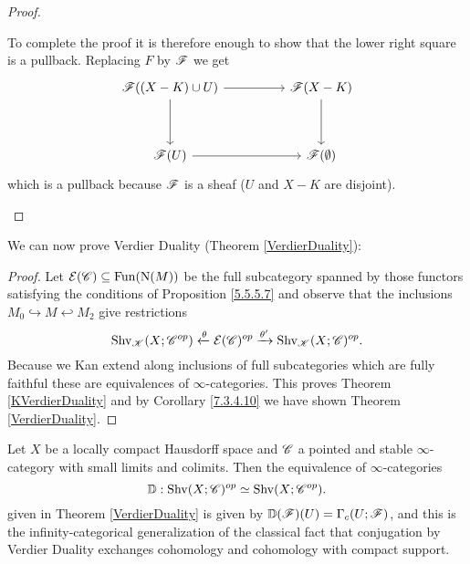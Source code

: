 \documentclass[../../thesis.tex]{subfiles}
\begin{document}
\begin{proof}
\begin{enumerate}[label=(\alph*)]
              To complete the proof it is therefore enough to show that the lower right square is a pullback.
              Replacing $F$ by $\mathscr{F}$ we get
              \[\begin{tikzcd}
                      {\F((X-K) \cup U)} && {\F(X-K)} \\
                      \\
                      {\F(U)} && {\F(\emptyset)}
                      \arrow[from=1-1, to=1-3]
                      \arrow[from=1-3, to=3-3]
                      \arrow[from=3-1, to=3-3]
                      \arrow[from=1-1, to=3-1]
                  \end{tikzcd}\]
              which is a pullback because $\mathscr{F}$ is a sheaf ($U$ and $X-K$ are disjoint).
    \end{enumerate}
\end{proof}
We can now prove Verdier Duality (Theorem \ref{VerdierDuality}):
\begin{proof}
    Let $\mathcal{E}(\mathscr{C}) \subseteq \mathrm{Fun}(\mathrm{N}(M))$ be the full subcategory spanned by those functors satisfying the conditions of Proposition \ref{5.5.5.7} and observe that the inclusions $M_0 \hookrightarrow M \hookleftarrow M_2$ give restrictions
    \[
        \mathrm{Shv}_{\mathscr{K}}(X;\mathscr{C}^{op}) \xleftarrow{\theta} \mathcal{E}(\mathscr{C})^{op} \xrightarrow{\theta'} \mathrm{Shv}_{\mathscr{K}}(X;\mathscr{C})^{op}.
    \]
    Because we Kan extend along inclusions of full subcategories which are fully faithful these are equivalences of $\infty$-categories.
    This proves Theorem \ref{KVerdierDuality} and by Corollary \ref{7.3.4.10} we have shown Theorem \ref{VerdierDuality}.
\end{proof}
\begin{proposition}[{\cite[Proposition 5.5.5.10]{HA}}]
    Let $X$ be a locally compact Hausdorff space and $\mathscr{C}$ a pointed and stable $\infty$-category with small limits and colimits.
    Then the equivalence of $\infty$-categories
    \[
        \mathbb{D} : \mathrm{Shv}(X;\mathscr{C})^{op} \simeq \mathrm{Shv}(X;\mathscr{C}^{op}).
    \]
    given in Theorem \ref{VerdierDuality} is given by $\mathbb{D}(\mathscr{F})(U) = \Gamma_c(U;\mathscr{F})$, and this is the infinity-categorical generalization of the classical fact that conjugation by Verdier Duality exchanges cohomology and cohomology with compact support.
\end{proposition}
\end{document}
